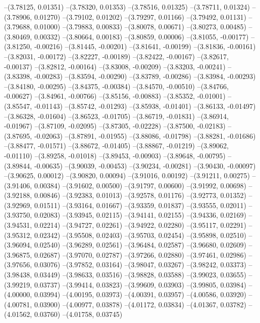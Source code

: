 --(3.78125, 0.01351)
--(3.78320, 0.01353)
--(3.78516, 0.01325)
--(3.78711, 0.01324)
--(3.78906, 0.01270)
--(3.79102, 0.01202)
--(3.79297, 0.01166)
--(3.79492, 0.01131)
--(3.79688, 0.01000)
--(3.79883, 0.00833)
--(3.80078, 0.00671)
--(3.80273, 0.00485)
--(3.80469, 0.00332)
--(3.80664, 0.00183)
--(3.80859, 0.00006)
--(3.81055, -0.00177)
--(3.81250, -0.00216)
--(3.81445, -0.00201)
--(3.81641, -0.00199)
--(3.81836, -0.00161)
--(3.82031, -0.00172)
--(3.82227, -0.00189)
--(3.82422, -0.00167)
--(3.82617, -0.00137)
--(3.82812, -0.00164)
--(3.83008, -0.00209)
--(3.83203, -0.00241)
--(3.83398, -0.00283)
--(3.83594, -0.00290)
--(3.83789, -0.00286)
--(3.83984, -0.00293)
--(3.84180, -0.00295)
--(3.84375, -0.00384)
--(3.84570, -0.00510)
--(3.84766, -0.00627)
--(3.84961, -0.00766)
--(3.85156, -0.00883)
--(3.85352, -0.01001)
--(3.85547, -0.01143)
--(3.85742, -0.01293)
--(3.85938, -0.01401)
--(3.86133, -0.01497)
--(3.86328, -0.01604)
--(3.86523, -0.01705)
--(3.86719, -0.01831)
--(3.86914, -0.01967)
--(3.87109, -0.02095)
--(3.87305, -0.02228)
--(3.87500, -0.02183)
--(3.87695, -0.02063)
--(3.87891, -0.01955)
--(3.88086, -0.01798)
--(3.88281, -0.01686)
--(3.88477, -0.01571)
--(3.88672, -0.01405)
--(3.88867, -0.01219)
--(3.89062, -0.01110)
--(3.89258, -0.01018)
--(3.89453, -0.00903)
--(3.89648, -0.00795)
--(3.89844, -0.00635)
--(3.90039, -0.00453)
--(3.90234, -0.00281)
--(3.90430, -0.00097)
--(3.90625, 0.00012)
--(3.90820, 0.00094)
--(3.91016, 0.00192)
--(3.91211, 0.00275)
--(3.91406, 0.00384)
--(3.91602, 0.00500)
--(3.91797, 0.00600)
--(3.91992, 0.00698)
--(3.92188, 0.00846)
--(3.92383, 0.01013)
--(3.92578, 0.01176)
--(3.92773, 0.01352)
--(3.92969, 0.01511)
--(3.93164, 0.01667)
--(3.93359, 0.01837)
--(3.93555, 0.02011)
--(3.93750, 0.02083)
--(3.93945, 0.02115)
--(3.94141, 0.02155)
--(3.94336, 0.02169)
--(3.94531, 0.02214)
--(3.94727, 0.02261)
--(3.94922, 0.02280)
--(3.95117, 0.02291)
--(3.95312, 0.02342)
--(3.95508, 0.02403)
--(3.95703, 0.02454)
--(3.95898, 0.02510)
--(3.96094, 0.02540)
--(3.96289, 0.02561)
--(3.96484, 0.02587)
--(3.96680, 0.02609)
--(3.96875, 0.02687)
--(3.97070, 0.02787)
--(3.97266, 0.02880)
--(3.97461, 0.02986)
--(3.97656, 0.03076)
--(3.97852, 0.03164)
--(3.98047, 0.03267)
--(3.98242, 0.03373)
--(3.98438, 0.03449)
--(3.98633, 0.03516)
--(3.98828, 0.03588)
--(3.99023, 0.03655)
--(3.99219, 0.03737)
--(3.99414, 0.03823)
--(3.99609, 0.03903)
--(3.99805, 0.03984)
--(4.00000, 0.03994)
--(4.00195, 0.03973)
--(4.00391, 0.03957)
--(4.00586, 0.03920)
--(4.00781, 0.03900)
--(4.00977, 0.03878)
--(4.01172, 0.03834)
--(4.01367, 0.03782)
--(4.01562, 0.03760)
--(4.01758, 0.03745)
